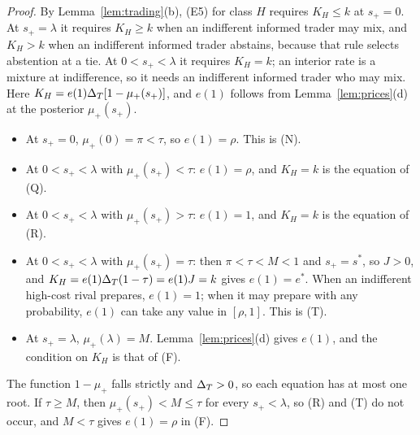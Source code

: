 \begin{proof}
By Lemma~\ref{lem:trading}(b), (E5) for class \(H\) requires \(K_H\le k\) at \(s_+=0\). At \(s_+=\lambda\) it requires
\(K_H\ge k\) when an indifferent informed trader may mix, and \(K_H>k\) when an indifferent informed trader abstains, because that
rule selects abstention at a tie. At \(0<s_+<\lambda\) it requires \(K_H=k\); an interior rate is a mixture at
indifference, so it needs an indifferent informed trader who may mix. Here \(K_H=e(1)\Delta_T[1-\mu_+(s_+)]\), and \(e(1)\)
follows from Lemma~\ref{lem:prices}(d) at the posterior \(\mu_+(s_+)\).
\begin{itemize}[leftmargin=2em]
\item At \(s_+=0\), \(\mu_+(0)=\pi<\tau\), so \(e(1)=\rho\). This is (N).
\item At \(0<s_+<\lambda\) with \(\mu_+(s_+)<\tau\): \(e(1)=\rho\), and \(K_H=k\) is the equation of (Q).
\item At \(0<s_+<\lambda\) with \(\mu_+(s_+)>\tau\): \(e(1)=1\), and \(K_H=k\) is the equation of (R).
\item At \(0<s_+<\lambda\) with \(\mu_+(s_+)=\tau\): then \(\pi<\tau<M<1\) and \(s_+=s^*\), so \(J>0\), and
\(K_H=e(1)\Delta_T(1-\tau)=e(1)J=k\) gives \(e(1)=e^*\). When an indifferent high-cost rival prepares,
\(e(1)=1\); when it may prepare with any probability, \(e(1)\) can take any value in \([\rho,1]\). This is (T).
\item At \(s_+=\lambda\), \(\mu_+(\lambda)=M\). Lemma~\ref{lem:prices}(d) gives \(e(1)\), and the condition on
\(K_H\) is that of (F).
\end{itemize}
The function \(1-\mu_+\) falls strictly and \(\Delta_T>0\), so each equation has at most one root. If \(\tau\ge M\), then
\(\mu_+(s_+)<M\le\tau\) for every \(s_+<\lambda\), so (R) and (T) do not occur, and \(M<\tau\) gives \(e(1)=\rho\) in (F).
\end{proof}


